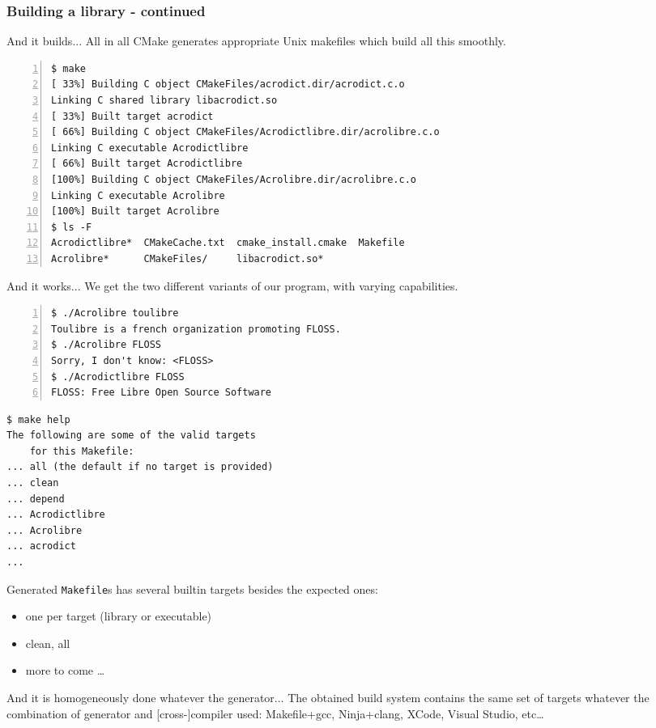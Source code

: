 \documentclass[compress,slidestop,table,usepdftitle=false
              ]
               {beamer}
\newcommand{\fname}[1]{\texttt{#1}}
\begin{document}
\begin{frame}
\frametitle{Building a library - continued}

\begin{block}{And it builds...}
All in all CMake generates appropriate Unix makefiles which build
all this smoothly.
\end{block}
\begin{Verbatim}[fontsize=\tiny,numbers=left,frame=topline,label=CMake + Unix Makefile]
$ make
[ 33%] Building C object CMakeFiles/acrodict.dir/acrodict.c.o
Linking C shared library libacrodict.so
[ 33%] Built target acrodict
[ 66%] Building C object CMakeFiles/Acrodictlibre.dir/acrolibre.c.o
Linking C executable Acrodictlibre
[ 66%] Built target Acrodictlibre
[100%] Building C object CMakeFiles/Acrolibre.dir/acrolibre.c.o
Linking C executable Acrolibre
[100%] Built target Acrolibre
$ ls -F
Acrodictlibre*  CMakeCache.txt  cmake_install.cmake  Makefile
Acrolibre*      CMakeFiles/     libacrodict.so*
\end{Verbatim}

\begin{block}{And it works...}
We get the two different variants of our program, with varying capabilities.
\end{block}
\begin{multicols}{2}
\begin{Verbatim}[fontsize=\tiny,numbers=left]
$ ./Acrolibre toulibre
Toulibre is a french organization promoting FLOSS.
$ ./Acrolibre FLOSS
Sorry, I don't know: <FLOSS>
$ ./Acrodictlibre FLOSS
FLOSS: Free Libre Open Source Software
\end{Verbatim}
\begin{Verbatim}[fontsize=\tiny,]
$ make help
The following are some of the valid targets
    for this Makefile:
... all (the default if no target is provided)
... clean
... depend
... Acrodictlibre
... Acrolibre
... acrodict
...
\end{Verbatim}
Generated \fname{Makefile}s has several builtin targets besides the
expected ones:
\begin{itemize}
\item one per target (library or executable)
\item clean, all
\item more to come \ldots
\end{itemize}
\end{multicols}

\begin{alertblock}{And it is homogeneously done whatever the generator...}
  The obtained build system contains the same set of targets whatever the combination
  of generator and [cross-]compiler used: Makefile+gcc, Ninja+clang, XCode, Visual Studio, etc\ldots
\end{alertblock}
\end{frame}
\end{document}

